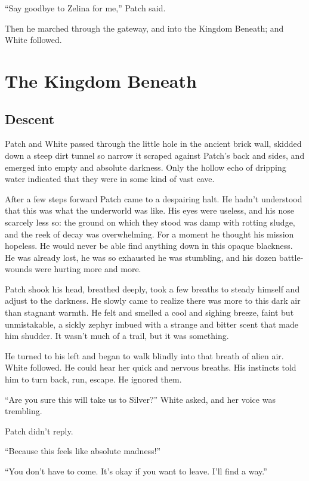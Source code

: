 \documentclass[ebook,oneside,openany,17pt]{memoir}
\newenvironment{tolerant}[1]{%
  \par\tolerance=#1\relax
}{%
  \par
}
\renewcommand{\thechapter}{\Roman{chapter}}
\newcounter{sections}
\newcommand{\sections}[1]{%
  \section*{#1}
  \addtocounter{sections}{1}%
  \pdfbookmark[1]{#1}{section.\thechapter.\thesections}}
\begin{document}
“Say goodbye to Zelina for me,” Patch said.

Then he marched through the gateway, and into the Kingdom Beneath; and
White followed.


\chapter{The Kingdom Beneath}

\sections{Descent}

Patch and White passed through the little hole in the ancient brick
wall, skidded down a steep dirt tunnel so narrow it scraped against
Patch’s back and sides, and emerged into empty and absolute
darkness. Only the hollow echo of dripping water indicated that they
were in some kind of vast cave.

After a few steps forward Patch came to a despairing halt. He hadn’t
understood that this was what the underworld was like. His eyes were
useless, and his nose scarcely less so: the ground on which they stood
was damp with rotting sludge, and the reek of decay was
overwhelming. For a moment he thought his mission hopeless. He would
never be able find anything down in this opaque blackness. He was
already lost, he was so exhausted he was stumbling, and his dozen
battle-wounds were hurting more and more.

\begin{tolerant}{1000}
Patch shook his head, breathed deeply, took a few breaths to steady
himself and adjust to the darkness. He slowly came to realize there
was more to this dark air than stagnant warmth. He felt and smell\-ed a
cool and sighing breeze, faint but unmistakable, a sickly zephyr
imbued with a strange and bitter scent that made him shudder. It
wasn’t much of a trail, but it was something.
\end{tolerant}

\begin{tolerant}{1000}
He turned to his left and began to walk blindly into that breath of
alien air. White followed. He could hear her quick and nervous
breaths. His instincts told him to turn back, run, escape. He ignored
them.
\end{tolerant}

“Are you sure this will take us to Silver?” White asked, and her voice
was trembling.

Patch didn’t reply.

“Because this feels like absolute madness!”

“You don’t have to come. It’s okay if you want to leave. I’ll find a
way.”
\end{document}
